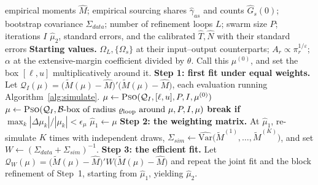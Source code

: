 \begin{algorithm}[H]
\caption{SMM estimation of $\mu$ by particle swarm optimisation}
\label{alg:smm}
\begin{algorithmic}[1]
\Require empirical moments $\widehat{M}$; empirical sourcing shares
  $\widehat{\gamma}_{as}$ and counts $\widehat{G}_s(0)$; bootstrap covariance
  $\Sigma_{data}$; number of refinement loops $L$; swarm size $P$; iterations $I$
\Ensure $\widehat{\mu}_2$, standard errors, and the calibrated
  $\widehat{T},\widehat{N}$ with their standard errors
\vspace{2pt}
\State \textbf{Starting values.} $\Omega_L,\{\Omega_s\}$ at their input--output
  counterparts; $A_r\propto\pi_r^{1/\varepsilon}$; $\alpha$ at the
  extensive-margin coefficient divided by $\theta$. Call this $\mu^{(0)}$, and
  set the box $[\ell,u]$ multiplicatively around it.
\vspace{3pt}
\State \textbf{Step 1: first fit under equal weights.} Let
  $\mathcal{Q}_I(\mu)=\bigl(\widetilde{M}(\mu)-\widehat{M}\bigr)'\bigl(\widetilde{M}(\mu)-\widehat{M}\bigr)$,
  each evaluation running Algorithm~\ref{alg:simulate}.
\State \quad $\mu\gets\Call{Pso}{\mathcal{Q}_I,[\ell,u],P,I,\mu^{(0)}}$
        \State $\mu\gets\Call{Pso}{\mathcal{Q}_I,\mathcal{B}\text{-box of radius }
          \varrho_{\text{loop}}\text{ around }\mu,P,I,\mu}$
    \EndFor
    \State \textbf{break if} $\max_k|\Delta\mu_k|/|\mu_k|<\epsilon_\mu$
\EndFor
\State $\widehat{\mu}_1\gets\mu$
\vspace{3pt}
\State \textbf{Step 2: the weighting matrix.} At $\widehat{\mu}_1$, re-simulate
  $K$ times with independent draws, $\Sigma_{sim}\gets\widehat{\mathrm{Var}}
  \bigl(\widetilde{M}^{(1)},\dots,\widetilde{M}^{(K)}\bigr)$, and set
  $W\gets(\Sigma_{data}+\Sigma_{sim})^{-1}$.
\vspace{3pt}
\State \textbf{Step 3: the efficient fit.} Let
  $\mathcal{Q}_W(\mu)=\bigl(\widetilde{M}(\mu)-\widehat{M}\bigr)'W
  \bigl(\widetilde{M}(\mu)-\widehat{M}\bigr)$ and repeat the joint fit and the block
  refinement of Step~1, starting from
  $\widehat{\mu}_1$, yielding $\widehat{\mu}_2$.

\end{algorithmic}
\end{algorithm}
